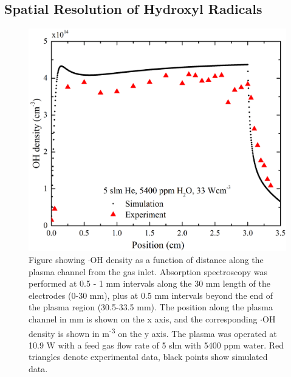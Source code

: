 \documentclass[11pt, oneside]{article}   	%
\begin{document}
\subsection{Spatial Resolution of Hydroxyl Radicals} \label{subsec:SpatialRes}

\begin{figure}
    \centering
    \includegraphics[width=\textwidth]{Figures/OHSpatialwithSimReal}
    \caption{Figure showing $\cdot$OH density as a function of distance along the plasma channel from the gas inlet. Absorption spectroscopy was performed at 0.5 - 1 mm intervals along the 30 mm length of the electrodes (0-30 mm), plus at 0.5 mm intervals beyond the end of the plasma region (30.5-33.5 mm). The position along the plasma channel in mm is shown on the x axis, and the corresponding $\cdot$OH density is shown in m\textsuperscript{-3} on the y axis. The plasma was operated at 10.9 W with a feed gas flow rate of 5 slm with 5400 ppm water. Red triangles denote experimental data, black points show simulated data.}
    \label{fig:SpatialRes}
\end{figure}
\end{document}
